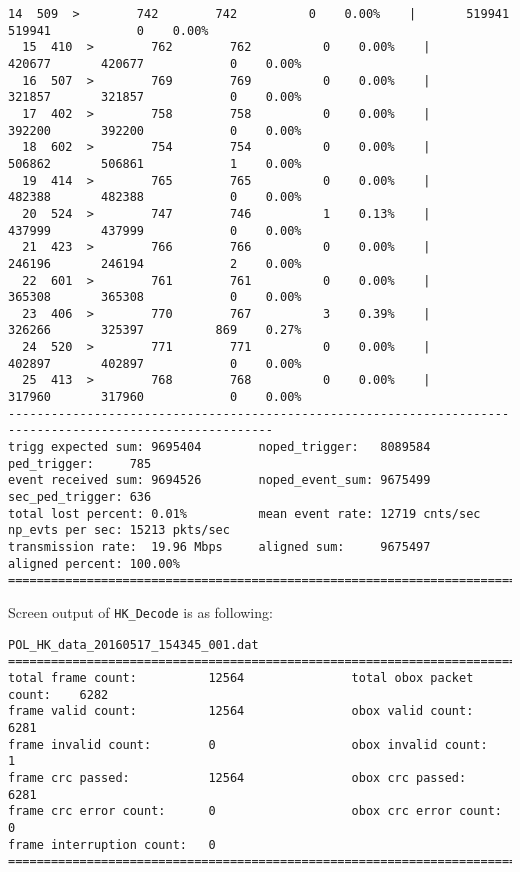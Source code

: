 \documentclass[a4paper, 12pt, onecolumn]{article}
\begin{document}
\begin{Verbatim}[fontsize=\tiny, frame=single]
  14  509  >        742        742          0    0.00%    |       519941       519941            0    0.00%
  15  410  >        762        762          0    0.00%    |       420677       420677            0    0.00%
  16  507  >        769        769          0    0.00%    |       321857       321857            0    0.00%
  17  402  >        758        758          0    0.00%    |       392200       392200            0    0.00%
  18  602  >        754        754          0    0.00%    |       506862       506861            1    0.00%
  19  414  >        765        765          0    0.00%    |       482388       482388            0    0.00%
  20  524  >        747        746          1    0.13%    |       437999       437999            0    0.00%
  21  423  >        766        766          0    0.00%    |       246196       246194            2    0.00%
  22  601  >        761        761          0    0.00%    |       365308       365308            0    0.00%
  23  406  >        770        767          3    0.39%    |       326266       325397          869    0.27%
  24  520  >        771        771          0    0.00%    |       402897       402897            0    0.00%
  25  413  >        768        768          0    0.00%    |       317960       317960            0    0.00%
-----------------------------------------------------------------------------------------------------------
trigg expected sum: 9695404        noped_trigger:   8089584             ped_trigger:     785                 
event received sum: 9694526        noped_event_sum: 9675499             sec_ped_trigger: 636                 
total lost percent: 0.01%          mean event rate: 12719 cnts/sec      np_evts per sec: 15213 pkts/sec      
transmission rate:  19.96 Mbps     aligned sum:     9675497             aligned percent: 100.00%             
===========================================================================================================
\end{Verbatim}

\newpage

Screen output of \texttt{HK\_Decode} is as following:

\begin{Verbatim}[fontsize=\tiny, frame=single]
POL_HK_data_20160517_154345_001.dat
=============================================================================================
total frame count:          12564               total obox packet count:    6282                
frame valid count:          12564               obox valid count:           6281                
frame invalid count:        0                   obox invalid count:         1                   
frame crc passed:           12564               obox crc passed:            6281                
frame crc error count:      0                   obox crc error count:       0                   
frame interruption count:   0                   
=============================================================================================
\end{Verbatim}
\end{document}
